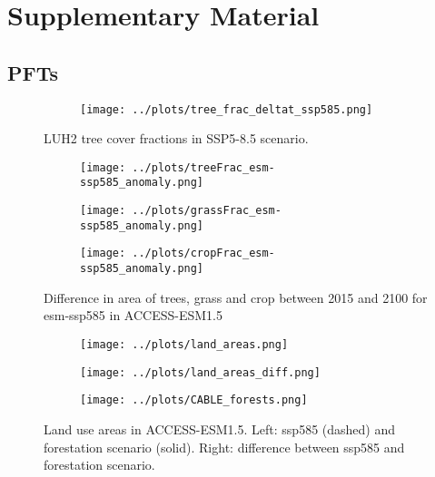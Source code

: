 \documentclass[]{article}
\begin{document}
\printbibliography

\section{Supplementary Material}
\setcounter{figure}{0}

\subsection{PFTs}

\begin{figure}[H]
    \centering
    \begin{subfigure}[b]{0.45\linewidth}
        \texttt{[image: ../plots/tree\_frac\_deltat\_ssp585.png]}
    \end{subfigure}
    \caption{LUH2 tree cover fractions in SSP5-8.5 scenario.}
    \label{fig:LUH2_tree_frac_ssp585}
\end{figure}

\begin{figure}[H]
    \centering
    \begin{subfigure}[b]{0.4\linewidth}
        \texttt{[image: ../plots/treeFrac\_esm-ssp585\_anomaly.png]}
    \end{subfigure}
    \begin{subfigure}[b]{0.4\linewidth}
        \texttt{[image: ../plots/grassFrac\_esm-ssp585\_anomaly.png]}
    \end{subfigure}
    \begin{subfigure}[b]{0.4\linewidth}
        \texttt{[image: ../plots/cropFrac\_esm-ssp585\_anomaly.png]}
    \end{subfigure}
    \caption{Difference in area of trees, grass and crop between 2015 and 2100 for esm-ssp585 in ACCESS-ESM1.5}
    \label{fig:ACCESS_land_cover}
\end{figure}


\begin{figure}[H]
    \centering
    \begin{subfigure}[b]{0.45\linewidth}
        \texttt{[image: ../plots/land\_areas.png]}
    \end{subfigure}
    \begin{subfigure}[b]{0.45\linewidth}
        \texttt{[image: ../plots/land\_areas\_diff.png]}
    \end{subfigure}
    \begin{subfigure}[b]{0.45\linewidth}
        \texttt{[image: ../plots/CABLE\_forests.png]}
    \end{subfigure}
    \caption{Land use areas in ACCESS-ESM1.5. Left: ssp585 (dashed) and forestation scenario (solid). Right: difference between ssp585 and forestation scenario.}
    \label{fig:ACCESS_land_use}
\end{figure}
\end{document}
